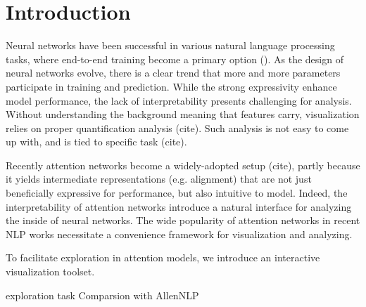 \section{Introduction}

Neural networks have been successful in various natural language processing tasks,
where end-to-end training become a primary option (\citet{Seo2016}).
As the design of neural networks evolve, there is a clear trend that more and more
parameters participate in training and prediction. While the strong expressivity
enhance model performance, the lack of interpretability presents challenging for analysis.
Without understanding the background meaning that features carry, visualization relies
on proper quantification analysis (cite). Such analysis is not easy to come up with,
and is tied to specific task (cite).


Recently attention networks become a widely-adopted setup (cite), partly because it yields
intermediate representations (e.g. alignment) that are not just beneficially expressive for performance,
but also intuitive to model. Indeed, the interpretability of attention networks introduce
a natural interface for analyzing the inside of neural networks. The wide popularity of attention networks
in recent NLP works necessitate a convenience framework for visualization and analyzing.

To facilitate exploration in attention models, we introduce an interactive visualization toolset.

exploration task
\cite{Seo2016}
Comparsion with AllenNLP
